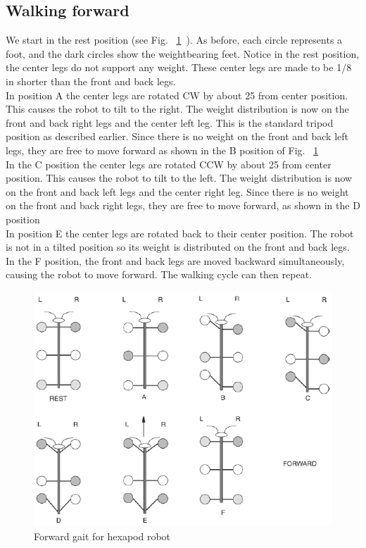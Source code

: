 \documentclass{report}
\begin{document}
\subsection{Walking forward}
We start in the rest position (see Fig. ~\ref{35}\ ). As before, each circle represents a foot, and the dark circles
show the weightbearing feet. Notice in the rest position, the center legs do not support any weight. These
center legs are made to be 1/8 in shorter than the front and back legs.\\
In position A the center legs are rotated CW by about 25 from center position. This causes the robot to tilt to the right. The weight distribution is now on the front and back right legs and the center left leg.
This is the standard tripod position as described earlier. Since there is no weight on the front and back left
legs, they are free to move forward as shown in the B position of Fig. ~\ref{35}\ \\
In the C position the center legs are rotated CCW by about 25 from center position. This causes the
robot to tilt to the left. The weight distribution is now on the front and back left legs and the center right
leg. Since there is no weight on the front and back right legs, they are free to move forward, as shown in the
D position\\
In position E the center legs are rotated back to their center position. The robot is not in a tilted position
so its weight is distributed on the front and back legs. In the F position, the front and back legs are moved
backward simultaneously, causing the robot to move forward. The walking cycle can then repeat.
\begin{figure}[h!]
\centering
\includegraphics[width=\textwidth]{fig103}
\caption{Forward gait for hexapod robot}
\label{35}
\end{figure}
\FloatBarrier
\end{document}
